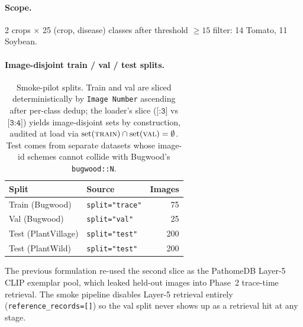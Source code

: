 \documentclass[11pt,twocolumn]{article}
\begin{document}
\paragraph{Scope.} 2 crops $\times$ 25 (crop, disease) classes
after threshold ${\geq}15$ filter: 14 Tomato, 11 Soybean.

\paragraph{Image-disjoint train / val / test splits.}
\begin{table}[H]\centering\small
\begin{tabular}{l l r}
\toprule
\textbf{Split} & \textbf{Source} & \textbf{Images} \\
\midrule
Train (Bugwood)    & \texttt{split="trace"} & 75 \\
Val   (Bugwood)    & \texttt{split="val"}   & 25 \\
Test  (PlantVillage) & \texttt{split="test"} & 200 \\
Test  (PlantWild)  & \texttt{split="test"}   & 200 \\
\bottomrule
\end{tabular}
\caption{Smoke-pilot splits. Train and val are sliced
deterministically by \texttt{Image Number} ascending after
per-class dedup; the loader's slice ($\texttt{[:3]}$ vs
$\texttt{[3:4]}$) yields image-disjoint sets by construction,
audited at load via
$\mathrm{set}(\textsc{train}) \cap \mathrm{set}(\textsc{val}) = \emptyset$.
Test comes from separate datasets whose image-id schemes
cannot collide with Bugwood's \texttt{bugwood::N}.}
\label{tab:smoke-splits}
\end{table}

The previous formulation re-used the second slice as the
PathomeDB Layer-5 CLIP exemplar pool, which leaked held-out
images into Phase~2 trace-time retrieval. The smoke pipeline
disables Layer-5 retrieval entirely
(\texttt{reference\_records=[]}) so the val split never
shows up as a retrieval hit at any stage.
\end{document}
